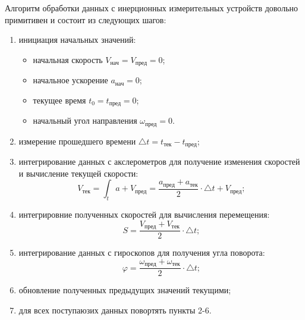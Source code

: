 Алгоритм обработки данных с инерционных измерительных устройств довольно примитивен и состоит из следующих шагов:
\begin{enumerate}
\item инициация начальных значений: 
	\begin{itemize}
	\item начальная скорость $V_{нач} = V_{пред} = 0$;
	\item начальное ускорение $a_{нач} = 0$;
	\item текущее время $t_0=t_{пред}=0$;
	\item начальный угол направления $ \omega_{пред} = 0$.
	\end{itemize}
\item измерение прошедшего времени $\triangle t = t_{тек}-t_{пред}$;
\item интегрирование данных с акслерометров для получение изменения скоростей и вычисление текущей скорости: 
$$V_{тек} = 
\int_t a + V_{пред} =  
\frac{a_{пред} + a_{тек}}{2} \cdot \triangle t + V_{пред};$$
\item интегрировние полученных скоростей для вычисления перемещения:
$$
S = \frac{V_{пред}+ V_{тек}}{2} \cdot \triangle t;
$$
\item интегрирование данных с гироскопов для получения угла поворота:
$$
\varphi = \frac{\omega_{пред}+ \omega_{тек}}{2} \cdot \triangle t;
$$
\item обновление полученных предыдущих значений текущими;
\item для всех поступаюзих данных повортять пункты 2-6. 
\end{enumerate}

